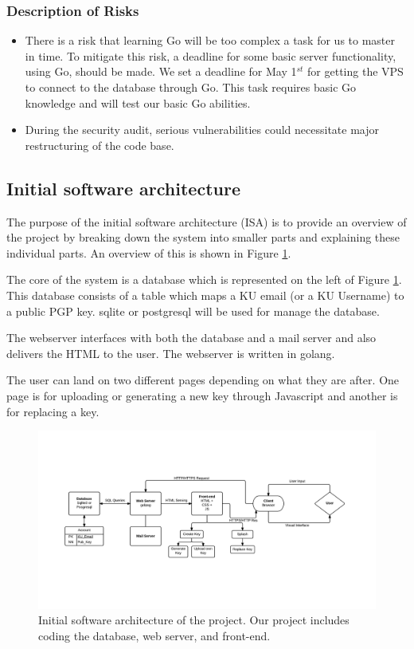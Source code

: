 \documentclass[11pt,a4paper]{report}
\begin{document}
\subsubsection{Description of Risks}
\begin{itemize}
\item There is a risk that learning Go will be too complex a task for us to master in time. To mitigate this risk, a deadline for some basic server functionality, using Go, should be made. We set a deadline for May 1$^{st}$ for getting the VPS to connect to the database through Go. This task requires basic Go knowledge and will test our basic Go abilities.
\item During the security audit, serious vulnerabilities could necessitate major restructuring of the code base.
\end{itemize}
\newpage
\subsection{Initial software architecture}
The purpose of the initial software architecture (ISA) is to provide an overview of the project by breaking down the system into smaller parts and explaining these individual parts. An overview of this is shown in Figure  \ref{fig:ISA}.

The core of the system is a database which is represented on the left of Figure  \ref{fig:ISA}. This database consists of a table which maps a KU email (or a KU Username) to a public PGP key. sqlite or postgresql will be used for manage the database.

The webserver interfaces with both the database and a mail server and also delivers the HTML to the user. The webserver is written in golang.

The user can land on two different pages depending on what they are after. One page is for uploading or generating a new key through Javascript and another is for replacing a key.

\begin{figure}[h!]
\centering
\includegraphics[width=1.1\textwidth]{pictures/pksu_isa_centered}
\caption{Initial software architecture of the project. Our project includes coding the database, web server, and front-end.}
\label{fig:ISA}
\end{figure}
\end{document}
